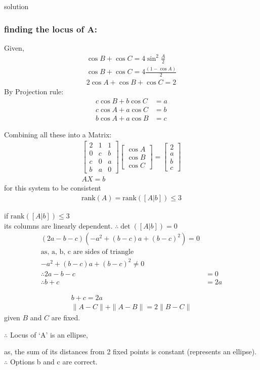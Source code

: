 \documentclass{beamer}
\begin{document}
\begin{frame}{solution}
    \frametitle{finding the locus of A:}
Given,
\begin{align}
\cos B + \cos C = 4 \sin^2 \frac{A}{2}\\
\cos B + \cos C = 4 \frac{(1 - \cos A)}{2}\\
2 \cos A + \cos B + \cos C = 2
\end{align}
By Projection rule:
\begin{align}c \cos B + b \cos C &= a \\c \cos A + a \cos C &= b \\b \cos A + a \cos B &= c\end{align}
\end{frame}
\begin{frame}
Combining all these into a Matrix:
\begin{align}\begin{bmatrix}2 & 1 & 1 \\0 & c & b \\c & 0 & a \\b & a & 0\end{bmatrix}\begin{bmatrix}\cos A \\\cos B \\\cos C\end{bmatrix}=\begin{bmatrix}2 \\a \\b \\c\end{bmatrix}\\
AX = b
\end{align}
for this system to be consistent
\begin{align}
\text{rank}(A) = \text{rank}([A|b]) \leq 3
\end{align}
\end{frame}
\begin{frame}
if $\text{rank}([A|b]) \leq 3$\\ its columns are linearly dependent.
$\therefore \det([A|b]) = 0$
\begin{align}
(2a - b - c)(-a^2 + (b-c)a + (b-c)^2) = 0\\
\text{as, a, b, c are sides of triangle}\\
-a^2 + (b-c)a + (b-c)^2 \neq 0\\
\therefore 2a - b - c &= 0 \\
\therefore b + c &= 2a
\end{align}
\end{frame}
\begin{frame}
\begin{align}
b + c = 2a\\
\| A - C \| + \| A - B \| = 2 \| B - C \|
\end{align}
given $B$ and $C$ are fixed.

$\therefore$ Locus of `A' is an ellipse,

as, the sum of its distances from 2 fixed points is constant (represents an ellipse).\\
$\therefore$ Options b and c are correct.
\end{frame}
\end{document}
